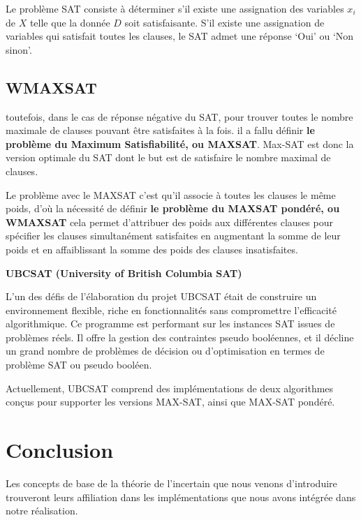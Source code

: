 Le problème SAT consiste à déterminer s’il existe une assignation des variables $x_i$ de $X$ telle que la donnée $D$ soit satisfaisante. S’il existe une assignation de variables qui satisfait toutes les clauses, le SAT admet une réponse ‘Oui’ ou ‘Non sinon’.\cite{hkhallafiThesis}
\subsection{WMAXSAT}

toutefois, dans le cas de réponse négative du SAT, pour trouver toutes le nombre maximale de clauses pouvant être satisfaites à la fois. il a fallu définir \textbf{le problème du Maximum Satisfiabilité, ou MAXSAT}. Max-SAT est donc la version optimale du SAT dont le but est de satisfaire le nombre maximal de clauses.

Le problème avec le MAXSAT c’est qu’il associe à toutes les clauses le même poids, d’où la nécessité de définir \textbf{le problème du MAXSAT pondéré, ou WMAXSAT} cela permet d'attribuer des poids aux différentes clauses pour spécifier les clauses simultanément satisfaites en augmentant la somme de leur poids et en affaiblissant la somme des poids des clauses insatisfaites. \cite{hkhallafiThesis}


\textbf{UBCSAT (University of British Columbia SAT)}

L'un des défis de l'élaboration du projet UBCSAT était de construire un environnement flexible, riche en fonctionnalités sans compromettre l'efficacité algorithmique. Ce programme est performant sur les instances SAT issues de problèmes réels. Il offre la gestion des contraintes pseudo booléennes, et il décline un grand nombre de problèmes de décision ou d’optimisation en termes de problème SAT ou pseudo booléen.    \cite{hassenThesis}

Actuellement, UBCSAT comprend des implémentations de deux algorithmes conçus pour supporter les versions MAX-SAT, ainsi que MAX-SAT pondéré.

{}
\section*{Conclusion}
Les concepts de base de la théorie de l’incertain que nous venons d'introduire trouveront leurs affiliation dans les implémentations que nous avons intégrée dans notre réalisation. 
